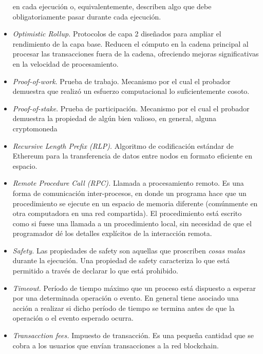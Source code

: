 \begin{itemize}
     en cada ejecución o, equivalentemente, describen algo que debe obligatoriamente pasar durante cada ejecución.
     \item \textit{Optimistic Rollup.} Protocolos de capa 2 diseñados para ampliar el rendimiento de la capa base.
     Reducen el cómputo en la cadena principal al procesar las transacciones fuera de la cadena, ofreciendo mejoras
     significativas en la velocidad de procesamiento.
     \item \textit{Proof-of-work}. Prueba de trabajo. Mecanismo por el cual el probador demuestra que
     realizó un esfuerzo computacional lo suficientemente cosoto.
     \item \textit{Proof-of-stake}. Prueba de participación. Mecanismo por el cual el probador demuestra la propiedad de
     algún bien valioso, en general, alguna cryptomoneda
     \item \textit{Recursive Length Prefix (RLP).} Algoritmo de codificación estándar de Ethereum para la transferencia de datos
     entre nodos en formato eficiente en espacio.
     \item \textit{Remote Procedure Call (RPC).} Llamada a procesamiento remoto. Es una forma de comunicación inter-procesos,
     en donde un programa hace que un procedimiento se ejecute en un espacio de memoria diferente (comúnmente en otra computadora
     en una red compartida). El procedimiento  está escrito como si fuese una llamada a un procedimiento local, sin necesidad de
     que el programador dé los detalles explícitos de la interacción remota.
     \item \textit{Safety.} Las propiedades de safety son aquellas que proscriben \emph{cosas malas} durante
     la ejecución. Una propiedad de safety caracteriza lo que está permitido a través de declarar lo que está
     prohibido. 
     \item \textit{Timeout.} Período de tiempo máximo que un proceso está dispuesto a esperar por una determinada
     operación o evento. En general tiene asociado una acción a realizar si dicho período de tiempo se termina antes
     de que la operación o el evento esperado ocurra.
     \item \textit{Transacction fees.} Impuesto de transacción. Es una pequeña cantidad que se cobra a los
     usuarios que envían transacciones a la red blockchain.  
\end{itemize}